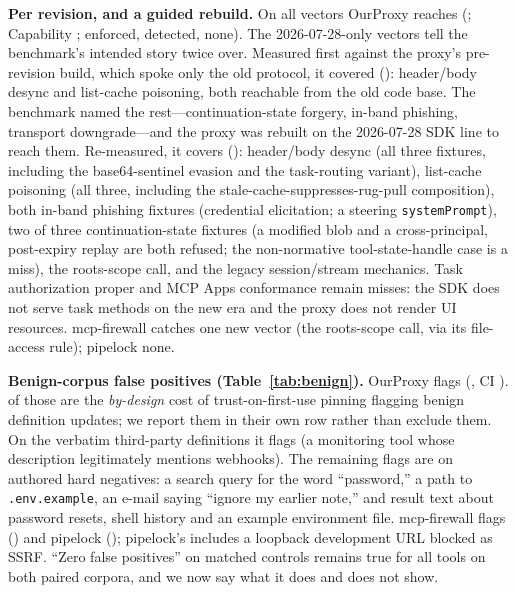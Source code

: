 \documentclass[conference]{IEEEtran}
\newcommand{\proxy}{OurProxy}
\newcommand{\rev}{2026-07-28}
\begin{document}
\textbf{Per revision, and a guided rebuild.} On all \nVectors{} vectors \proxy{} reaches \bastDevAll{} (\bastDevAllFrac; Capability \bastCapAll; \bastEnf{} enforced, \bastDet{} detected, \bastNone{} none). The \nNew{} \rev-only vectors tell the benchmark's intended story twice over. Measured first against the proxy's pre-revision build, which spoke only the old protocol, it covered \bastNewPrev{} (\bastNewPrevFrac): header/body desync and list-cache poisoning, both reachable from the old code base. The benchmark named the rest---continuation-state forgery, in-band phishing, transport downgrade---and the proxy was rebuilt on the \rev{} SDK line to reach them. Re-measured, it covers \bastNew{} (\bastNewFrac): header/body desync (all three fixtures, including the base64-sentinel evasion and the task-routing variant), list-cache poisoning (all three, including the stale-cache-suppresses-rug-pull composition), both in-band phishing fixtures (credential elicitation; a steering \texttt{systemPrompt}), two of three continuation-state fixtures (a modified blob and a cross-principal, post-expiry replay are both refused; the non-normative tool-state-handle case is a miss), the roots-scope call, and the legacy session/stream mechanics. Task authorization proper and MCP Apps conformance remain misses: the SDK does not serve task methods on the new era and the proxy does not render UI resources. mcp-firewall catches one new vector (the roots-scope call, via its file-access rule); pipelock none.

\textbf{Benign-corpus false positives (Table~\ref{tab:benign}).} \proxy{} flags \bastBenignFP{} (\bastBenignRate, CI \bastBenignCI). \bastBenignDefChange{} of those are the \emph{by-design} cost of trust-on-first-use pinning flagging benign definition updates; we report them in their own row rather than exclude them. On the \nHarvested{} verbatim third-party definitions it flags \bastBenignHarvestedFP{} (a monitoring tool whose description legitimately mentions webhooks). The remaining flags are on authored hard negatives: a search query for the word ``password,'' a path to \texttt{.env.example}, an e-mail saying ``ignore my earlier note,'' and result text about password resets, shell history and an example environment file. mcp-firewall flags \fwBenignFP{} (\fwBenignRate) and pipelock \plBenignFP{} (\plBenignRate); pipelock's includes a loopback development URL blocked as SSRF. ``Zero false positives'' on matched controls remains true for all tools on both paired corpora, and we now say what it does and does not show.
\end{document}
